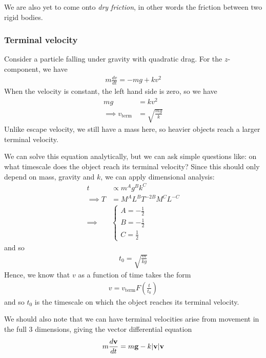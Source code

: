 \documentclass{../../template/note}
\begin{document}
    We are also yet to come onto \emph{dry friction}, in other words the friction between two rigid bodies.

    \subsubsection{Terminal velocity}

    Consider a particle falling under gravity with quadratic drag. For the \(z\)-component, we have
    \begin{align*}
        m \frac{dv}{dt} = -mg+kv^2
    \end{align*}
    When the velocity is constant, the left hand side is zero, so we have
    \begin{align*}
        mg &= kv^2 \\
        \implies v_\text{term} &= \sqrt{\frac{mg}{k}}
    \end{align*}
    Unlike escape velocity, we still have a mass here, so heavier objects reach a larger terminal velocity.

    We can solve this equation analytically, but we can ask simple questions like: on what timescale does the object reach its terminal velocity? Since this should only depend on mass, gravity and \(k\), we can apply dimensional analysis:
    \begin{align*}
        t &\propto m^A g^B k^C \\
        \implies \si{T} &= \si{M^AL^BT^{-2B}M^CL^{-C}} \\
        \implies &\begin{cases}
            A = -\frac 1 2 \\
            B = -\frac 1 2 \\
            C = \frac 1 2 
        \end{cases}
    \end{align*}
    and so
    \begin{align*}
        t_0 = \sqrt{\frac{m}{kg}}
    \end{align*}
    Hence, we know that \(v\) as a function of time takes the form
    \begin{align*}
        v = v_\text{term} F\left(\frac t {t_0}\right)
    \end{align*}
    and so \(t_0\) is the timescale on which the object reaches its terminal velocity.    

    We should also note that we can have terminal velocities arise from movement in the full 3 dimensions, giving the vector differential equation
    \begin{align*}
        m \frac{d \V v}{dt} = m \V g - k|\V v|\V v
    \end{align*}
    
\end{document}
